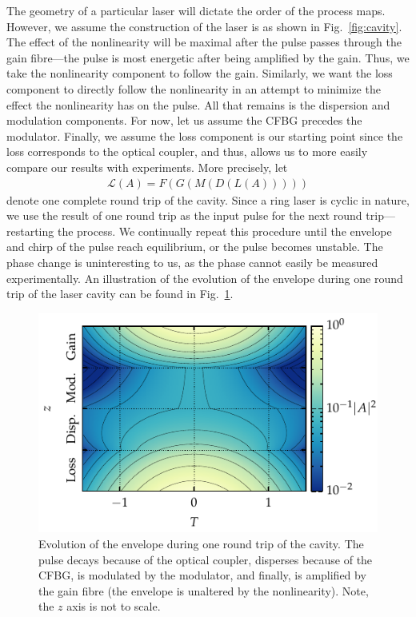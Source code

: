 \documentclass[9pt,twocolumn,twoside]{osajnl}
\begin{document}
The geometry of a particular laser will dictate the order of the process maps. However, we assume the construction of the laser is as shown in Fig.~\ref{fig:cavity}. The effect of the nonlinearity will be maximal after the pulse passes through the gain fibre---the pulse is most energetic after being amplified by the gain. Thus, we take the nonlinearity component to follow the gain. Similarly, we want the loss component to directly follow the nonlinearity in an attempt to minimize the effect the nonlinearity has on the pulse. All that remains is the dispersion and modulation components. For now, let us assume the CFBG precedes the modulator. Finally, we assume the loss component is our starting point since the loss corresponds to the optical coupler, and thus, allows us to more easily compare our results with experiments. More precisely, let
\begin{align}
	\mathcal{L}(A) = F(G(M(D(L(A)))))
	\label{eq:order}
\end{align}
denote one complete round trip of the cavity. Since a ring laser is cyclic in nature, we use the result of one round trip as the input pulse for the next round trip---restarting the process. We continually repeat this procedure until the envelope and chirp of the pulse reach equilibrium, or the pulse becomes unstable. The phase change is uninteresting to us, as the phase cannot easily be measured experimentally. An illustration of the evolution of the envelope during one round trip of the laser cavity can be found in Fig.~\ref{fig:cavityevo}.

\begin{figure}[tbp]
	\centering
	\includegraphics{Figures/Evo}
	\caption{Evolution of the envelope during one round trip of the cavity. The pulse decays because of the optical coupler, disperses because of the CFBG, is modulated by the modulator, and finally, is amplified by the gain fibre (the envelope is unaltered by the nonlinearity). Note, the $z$ axis is not to scale.}
	\label{fig:cavityevo}
\end{figure}
\end{document}
